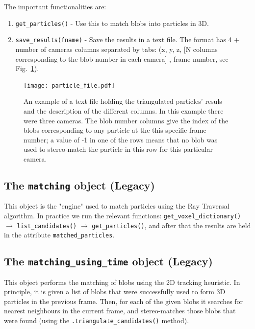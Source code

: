 \documentclass[10pt,a4paper]{article}
\begin{document}
The important functionalities are:
%
\begin{enumerate}
	\item \texttt{get\_particles()} - Use this to match blobs into particles in 3D.
	\item \texttt{save\_results(fname)} - Save the results in a text file. The format has 4 + number of cameras columns separated by tabs:
	(x, y, z, [N columns corresponding to the blob number in each camera] , frame number, see Fig.~\ref{fig:particlefile}).
\end{enumerate}



\begin{figure}[!ht]
	\centering
	\texttt{[image: particle\_file.pdf]}
	\caption{An example of a text file holding the triangulated particles' resuls and the description of the different columns. In this example there were three cameras. The blob number columns give the index of the blobs corresponding to any particle at the this specific frame number; a value of -1 in one of the rows means that no blob was used to stereo-match the particle in this row for this particular camera. \label{fig:particlefile}} 
\end{figure}




\subsection{The \texttt{matching} object  (Legacy)}

This object is the "engine" used to match particles using the Ray Traversal algorithm. In practice we run the relevant functions: \texttt{get\_voxel\_dictionary()} $\rightarrow$ \texttt{list\_candidates()} $\rightarrow$ \texttt{get\_particles()}, and after that the results are held in the attribute \texttt{matched\_particles}.




\subsection{The \texttt{matching\_using\_time} object  (Legacy)}

This object performs the matching of blobs using the 2D tracking heuristic. In principle, it is given a list of blobs that were successfully used to form 3D particles in the previous frame. Then, for each of the given blobs it searches for nearest neighbours in the current frame, and stereo-matches those blobs that were found (using the \texttt{.triangulate\_candidates()} method). 
\end{document}
